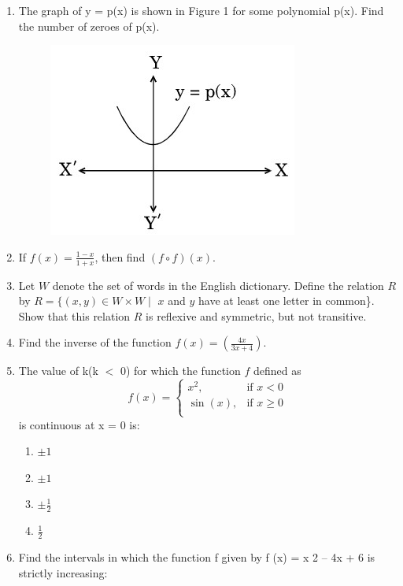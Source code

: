 \documentclass{article}
\begin{document}
\begin{enumerate}

\item The graph of y = p(x) is shown in Figure 1 for some polynomial p(x). Find the number of zeroes of p(x).

\begin{figure}[h]
\centering
\includegraphics[width=0.4\linewidth]{ques8.jpg}
\caption{}
\end{figure}

\item If $f(x) = \frac{1-x}{1+x}$, then find $(f\circ f)(x)$.


\item Let $W$ denote the set of words in the English dictionary. Define the relation $R$ by
$R = \{(x, y) \in W \times W \mid$ $x$ and $y$ have at least one letter in common\}.
Show that this relation $R$ is reflexive and symmetric, but not transitive.

\item Find the inverse of the function $f(x) = (\frac{4x}{3x+4})$.

\item The value of k(k $<$ 0) for which the function $f$ defined as 
\[
f(x) = \begin{cases}
x^2, & \text{if } x < 0 \\
\sin(x), & \text{if } x \geq 0  \\
\end{cases}
\]
is continuous at x = 0 is:

\begin{enumerate}
     \item $\pm1$ 

     \item $\pm1$ 

     \item  $\pm\frac{1}{2}$ 

     \item  $\frac{1}{2}$ 

\end{enumerate}


\item Find the intervals in which the function f given by f (x) = x 2 – 4x + 6 is strictly
increasing:


\end{enumerate}
\end{document}
